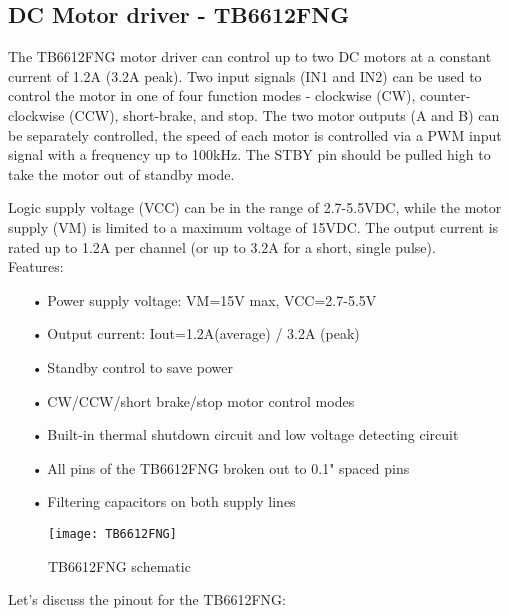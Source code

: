 \documentclass[
10pt, %
a4paper, %
oneside, %
headinclude,footinclude, %
BCOR=5mm, %
table,
]{scrartcl}
\begin{document}
\subsection {DC Motor driver - TB6612FNG}
The TB6612FNG motor driver can control up to two DC motors at a constant current of 1.2A (3.2A peak). Two input signals (IN1 and IN2) can be used to control the motor in one of four function modes - clockwise (CW), counter-clockwise (CCW), short-brake, and stop. The two motor outputs (A and B) can be separately controlled, the speed of each motor is controlled via a PWM input signal with a frequency up to 100kHz. The STBY pin should be pulled high to take the motor out of standby mode.

Logic supply voltage (VCC) can be in the range of 2.7-5.5VDC, while the motor supply (VM) is limited to a maximum voltage of 15VDC. The output current is rated up to 1.2A per channel (or up to 3.2A for a short, single pulse).\\

Features:
\begin{itemize}
\item[•] Power supply voltage: VM=15V max, VCC=2.7-5.5V
\item[•] Output current: Iout=1.2A(average) / 3.2A (peak)
\item[•] Standby control to save power
\item[•] CW/CCW/short brake/stop motor control modes
\item[•] Built-in thermal shutdown circuit and low voltage detecting circuit
\item[•] All pins of the TB6612FNG broken out to 0.1" spaced pins
\item[•] Filtering capacitors on both supply lines
\end{itemize}

\begin{figure}[H]
\centering
\texttt{[image: TB6612FNG]} 
\caption[TB6612FNG schematic]{TB6612FNG schematic}
\label{fig:TB6612FNG}
\end{figure}
Let’s discuss the pinout for the TB6612FNG:


\newcolumntype{b}{X}
\end{document}
